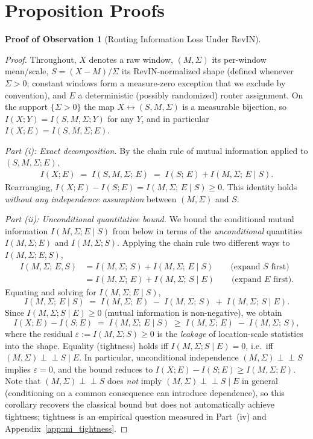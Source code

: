 \documentclass{article}
\begin{document}
\section{Proposition Proofs}
\label{app:proofs}

\textbf{Proof of Observation 1} (Routing Information Loss Under RevIN).

\begin{proof}
Throughout, $X$ denotes a raw window, $(M,\Sigma)$ its per-window mean/scale, $S = (X-M)/\Sigma$ its RevIN-normalized shape (defined whenever $\Sigma > 0$; constant windows form a measure-zero exception that we exclude by convention), and $E$ a deterministic (possibly randomized) router assignment. On the support $\{\Sigma > 0\}$ the map $X \leftrightarrow (S, M, \Sigma)$ is a measurable bijection, so $I(X; Y) = I(S, M, \Sigma; Y)$ for any $Y$, and in particular $I(X; E) = I(S, M, \Sigma; E)$.

\emph{Part (i): Exact decomposition.} By the chain rule of mutual information applied to $(S, M, \Sigma; E)$,
\begin{align*}
I(X; E) \;=\; I(S, M, \Sigma;\, E) \;=\; I(S;\, E) + I(M, \Sigma;\, E \mid S).
\end{align*}
Rearranging, $I(X; E) - I(S; E) = I(M, \Sigma;\, E \mid S) \geq 0$. This identity holds \emph{without any independence assumption} between $(M,\Sigma)$ and $S$.

\emph{Part (ii): Unconditional quantitative bound.} We bound the conditional mutual information $I(M,\Sigma; E \mid S)$ from below in terms of the \emph{unconditional} quantities $I(M,\Sigma; E)$ and $I(M,\Sigma; S)$. Applying the chain rule two different ways to $I(M,\Sigma; E, S)$,
\begin{align*}
I(M,\Sigma;\, E, S) &= I(M,\Sigma;\, S) + I(M,\Sigma;\, E \mid S) \qquad\text{(expand $S$ first)} \\
                    &= I(M,\Sigma;\, E) + I(M,\Sigma;\, S \mid E) \qquad\text{(expand $E$ first).}
\end{align*}
Equating and solving for $I(M,\Sigma; E \mid S)$,
\[
I(M,\Sigma;\, E \mid S) \;=\; I(M,\Sigma;\, E) \;-\; I(M,\Sigma;\, S) \;+\; I(M,\Sigma;\, S \mid E).
\]
Since $I(M,\Sigma; S \mid E) \geq 0$ (mutual information is non-negative), we obtain
\[
I(X; E) - I(S; E) \;=\; I(M,\Sigma;\, E \mid S) \;\geq\; I(M,\Sigma;\, E) \;-\; I(M,\Sigma;\, S),
\]
where the residual $\varepsilon := I(M,\Sigma; S) \geq 0$ is the \emph{leakage} of location-scale statistics into the shape. Equality (tightness) holds iff $I(M,\Sigma; S \mid E) = 0$, i.e.\ iff $(M,\Sigma) \perp\!\!\!\perp S \mid E$. In particular, unconditional independence $(M,\Sigma) \perp\!\!\!\perp S$ implies $\varepsilon = 0$, and the bound reduces to $I(X;E) - I(S;E) \geq I(M,\Sigma; E)$. Note that $(M,\Sigma) \perp\!\!\!\perp S$ does \emph{not} imply $(M,\Sigma) \perp\!\!\!\perp S \mid E$ in general (conditioning on a common consequence can introduce dependence), so this corollary recovers the classical bound but does not automatically achieve tightness; tightness is an empirical question measured in Part~(iv) and Appendix~\ref{app:mi_tightness}.


\end{proof}
\end{document}
